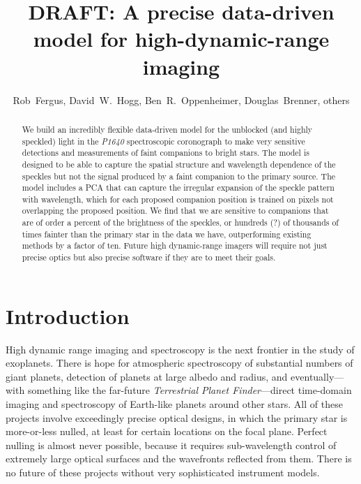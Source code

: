 \documentclass[12pt,pdftex,preprint]{aastex}
\newcommand{\project}[1]{\textsl{#1}}
\begin{document}
\title{DRAFT: A precise data-driven model for high-dynamic-range imaging}

\author{Rob~Fergus,
        David~W.~Hogg,
        Ben~R.~Oppenheimer,
        Douglas~Brenner,
        others}

\begin{abstract}
We build an incredibly flexible data-driven model for the unblocked
(and highly speckled) light in the \project{P1640} spectroscopic
coronograph to make very sensitive detections and measurements of
faint companions to bright stars.  The model is designed to be able to
capture the spatial structure and wavelength dependence of the
speckles but not the signal produced by a faint companion to the
primary source.  The model includes a PCA that can capture the
irregular expansion of the speckle pattern with wavelength, which for
each proposed companion position is trained on pixels not overlapping
the proposed position.  We find that we are sensitive to companions
that are of order a percent of the brightness of the speckles, or
hundreds (?) of thousands of times fainter than the primary star in
the data we have, outperforming existing methods by a factor of ten.
Future high dynamic-range imagers will require not just precise optics
but also precise software if they are to meet their goals.
\end{abstract}

\section{Introduction}

High dynamic range imaging and spectroscopy is the next frontier in
the study of exoplanets.  There is hope for atmospheric spectroscopy
of substantial numbers of giant planets, detection of planets at large
albedo and radius, and eventually---with something like the far-future
\project{Terrestrial Planet Finder}---direct time-domain imaging and
spectroscopy of Earth-like planets around other stars.  All of these
projects involve exceedingly precise optical designs, in which the
primary star is more-or-less nulled, at least for certain locations on
the focal plane.  Perfect nulling is almost never possible, because it
requires sub-wavelength control of extremely large optical surfaces
and the wavefronts reflected from them.  There is no future of these
projects without very sophisticated instrument models.
\end{document}
